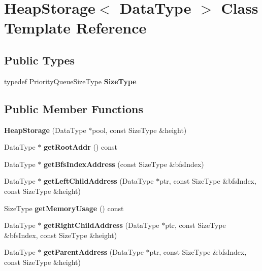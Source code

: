 \hypertarget{class_heap_storage}{
\section{HeapStorage$<$ DataType $>$ Class Template Reference}
\label{class_heap_storage}
}
\subsection*{Public Types}
\begin{DoxyCompactItemize}
\item 
\hypertarget{class_heap_storage_ab2047ebf05ca7b905d6a492fb80facfc}{
typedef PriorityQueueSizeType {\bfseries SizeType}}
\label{class_heap_storage_ab2047ebf05ca7b905d6a492fb80facfc}

\end{DoxyCompactItemize}
\subsection*{Public Member Functions}
\begin{DoxyCompactItemize}
\item 
\hypertarget{class_heap_storage_add7bd97ff6c948394cdc02b1afa2caee}{
{\bfseries HeapStorage} (DataType $\ast$pool, const SizeType \&height)}
\label{class_heap_storage_add7bd97ff6c948394cdc02b1afa2caee}

\item 
\hypertarget{class_heap_storage_a5fc317d44174d0dea20815ec8ee84821}{
DataType $\ast$ {\bfseries getRootAddr} () const }
\label{class_heap_storage_a5fc317d44174d0dea20815ec8ee84821}

\item 
\hypertarget{class_heap_storage_a23e3de95a9d8128a306fd8a0cb9345cb}{
DataType $\ast$ {\bfseries getBfsIndexAddress} (const SizeType \&bfsIndex)}
\label{class_heap_storage_a23e3de95a9d8128a306fd8a0cb9345cb}

\item 
\hypertarget{class_heap_storage_ab563b952fcdae698a85b6df71fb25cb6}{
DataType $\ast$ {\bfseries getLeftChildAddress} (DataType $\ast$ptr, const SizeType \&bfsIndex, const SizeType \&height)}
\label{class_heap_storage_ab563b952fcdae698a85b6df71fb25cb6}

\item 
\hypertarget{class_heap_storage_ae90ac24c7213eac79922c547c3411c47}{
SizeType {\bfseries getMemoryUsage} () const }
\label{class_heap_storage_ae90ac24c7213eac79922c547c3411c47}

\item 
\hypertarget{class_heap_storage_a6cb1ac1e21ccc1a8fcfc0ba9a5039051}{
DataType $\ast$ {\bfseries getRightChildAddress} (DataType $\ast$ptr, const SizeType \&bfsIndex, const SizeType \&height)}
\label{class_heap_storage_a6cb1ac1e21ccc1a8fcfc0ba9a5039051}

\item 
\hypertarget{class_heap_storage_a831d4fe9f72b5215fc96bcae581c5ec8}{
DataType $\ast$ {\bfseries getParentAddress} (DataType $\ast$ptr, const SizeType \&bfsIndex, const SizeType \&height)}
\label{class_heap_storage_a831d4fe9f72b5215fc96bcae581c5ec8}

\end{DoxyCompactItemize}
